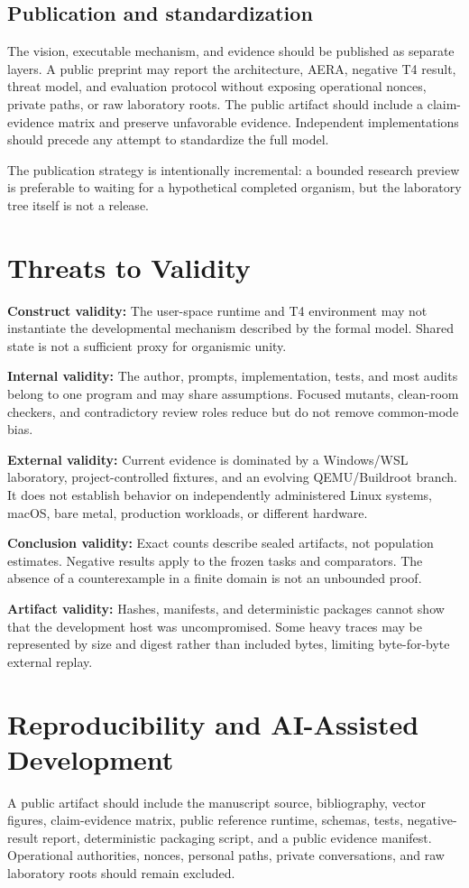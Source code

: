 \documentclass[journal,10pt]{IEEEtran}
\newcommand{\AERA}{\textsc{AERA}}
\begin{document}
\subsection{Publication and standardization}
The vision, executable mechanism, and evidence should be published as separate layers. A public preprint may report the architecture, \AERA{}, negative T4 result, threat model, and evaluation protocol without exposing operational nonces, private paths, or raw laboratory roots. The public artifact should include a claim-evidence matrix and preserve unfavorable evidence. Independent implementations should precede any attempt to standardize the full model.

The publication strategy is intentionally incremental: a bounded research preview is preferable to waiting for a hypothetical completed organism, but the laboratory tree itself is not a release.

\section{Threats to Validity}
\textbf{Construct validity:} The user-space runtime and T4 environment may not instantiate the developmental mechanism described by the formal model. Shared state is not a sufficient proxy for organismic unity.

\textbf{Internal validity:} The author, prompts, implementation, tests, and most audits belong to one program and may share assumptions. Focused mutants, clean-room checkers, and contradictory review roles reduce but do not remove common-mode bias.

\textbf{External validity:} Current evidence is dominated by a Windows/WSL laboratory, project-controlled fixtures, and an evolving QEMU/Buildroot branch. It does not establish behavior on independently administered Linux systems, macOS, bare metal, production workloads, or different hardware.

\textbf{Conclusion validity:} Exact counts describe sealed artifacts, not population estimates. Negative results apply to the frozen tasks and comparators. The absence of a counterexample in a finite domain is not an unbounded proof.

\textbf{Artifact validity:} Hashes, manifests, and deterministic packages cannot show that the development host was uncompromised. Some heavy traces may be represented by size and digest rather than included bytes, limiting byte-for-byte external replay.

\section{Reproducibility and AI-Assisted Development}
A public artifact should include the manuscript source, bibliography, vector figures, claim-evidence matrix, public reference runtime, schemas, tests, negative-result report, deterministic packaging script, and a public evidence manifest. Operational authorities, nonces, personal paths, private conversations, and raw laboratory roots should remain excluded.
\end{document}
